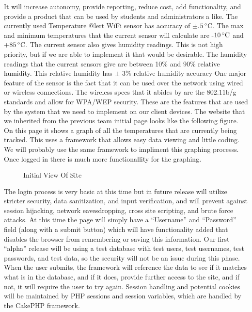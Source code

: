 \documentclass{report}
\begin{document}
It will increase autonomy, provide reporting, reduce cost, add functionality, and provide a product that can be used by students and administrators a like.
\newline
\indent
	The currently used Temperature @lert WiFi sensor has accuracy of $\pm$.$5\,^{\circ}{\rm C}$. The max and minimum temperatures that the current sensor will calculate are -$10\,^{\circ}{\rm C}$ and +$85\,^{\circ}{\rm C}$. 
The current sensor also gives humidity readings. 
This is not high priority, but if we are able to implement it that would be desirable.
 The humidity readings that the current sensors give are between 10$\%$ and 90$\%$ relative humidity. 
This relative humidity has $\pm$ 3$\%$ relative humidity accuracy One major feature of the sensor is the fact that it can be used over the network using wired or wireless connections. 
The wireless specs that it abides by are the 802.11b/g standards and allow for WPA/WEP security. 
These are the features that are used by the system that we need to implement on our client devices.
\newline
\indent
The website that we inherited from the previous team initial page looks like the following figure. 
On this page it shows a graph of all the temperatures that are currently being tracked. 
This uses a framework that allows easy data viewing and little coding. 
We will probably use the same framework to impliment this graphing processs. 
Once logged in there is much more functionallity for the graphing. 
\begin{figure}[H]
\caption{Initial View Of Site}
\end{figure}
\newpage
The login process is very basic at this time but in future release will utilize stricter security, data sanitization, and input verification, and will prevent against session hijacking, network eavesdropping, cross site scripting, and brute force attacks.  At this time the page will simply have a “Username” and “Password” field (along with a submit button) which will have functionality added that disables the browser from remembering or saving this information.  Our first “alpha” release will be using a test database with test users, test usernames, test passwords, and test data, so the security will not be an issue during this phase. When the user submits, the framework will reference the data to see if it matches what is in the database, and if it does, provide further access to the site, and if not, it will require the user to try again.  Session handling and potential cookies will be maintained by PHP sessions and session variables, which are handled by the CakePHP framework. 	
\end{document}
